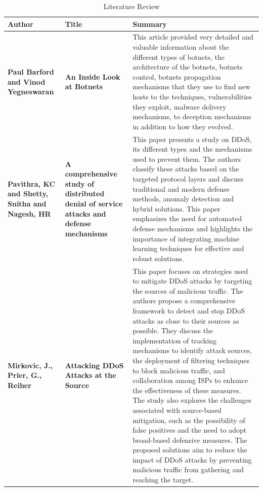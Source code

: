 \documentclass[a4paper, 12pt]{report} %
\begin{document}
            \begin{spacing}{1}
                \begin{table}
                    \centering
                    \label{tab:litterature_review}
                    \caption{Literature Review}
                    \begin{tabularx}{\linewidth}{|p{2cm}|p{3cm}|X|}
                        \hline
                        \textbf{Author} & \textbf{Title} & \textbf{Summary} \\
                        \hline
                        \textbf{Paul Barford and Vinod Yegneswaran} & \textbf{An Inside Look at Botnets} \cite{10.1007/978-0-387-44599-1_8} & This article provided very detailed and valuable information about the different types of botnets, the architecture of the botnets, botnets control, botnets propagation mechanisms that they use to find new hosts to the techniques, vulnerabilities they exploit, malware delivery mechanisms, to deception mechanisms in addition to how they evolved.\\
                        \hline
                        \textbf{Pavithra, KC and Shetty, Snitha and Nagesh, HR} & \textbf{A comprehensive study of distributed denial of service attacks and defense mechanisms} \cite{pavithra2014comprehensive} & This paper presents a study on DDoS, its different types and the mechanisms used to prevent them. The authors classify these attacks based on the targeted protocol layers and discuss traditional and modern defense methods, anomaly detection and hybrid solutions. This paper emphasizes the need for automated defense mechanisms and highlights the importance of integrating machine learning techniques for effective and robust solutions. \\
                        \hline
                        \textbf{Mirkovic, J., Prier, G., Reiher} & \textbf{Attacking DDoS Attacks at the Source} \cite{1181418} & This paper focuses on strategies used to mitigate DDoS attacks by targeting the sources of malicious traffic. The authors propose a comprehensive framework to detect and stop DDoS attacks as close to their sources as possible. They discuss the implementation of tracking mechanisms to identify attack sources, the deployment of filtering techniques to block malicious traffic, and collaboration among ISPs to enhance the effectiveness of these measures. The study also explores the challenges associated with source-based mitigation, such as the possibility of false positives and the need to adopt broad-based defensive measures. The proposed solutions aim to reduce the impact of DDoS attacks by preventing malicious traffic from gathering and reaching the target. \\
                        \hline
                    \end{tabularx}
                \end{table}
            \end{spacing}
        
\end{document}
